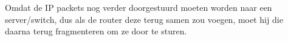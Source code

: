 Omdat de IP packets nog verder doorgestuurd moeten worden naar een server/switch, dus als de router deze terug samen zou voegen, moet hij die daarna terug fragmenteren om ze door te sturen.